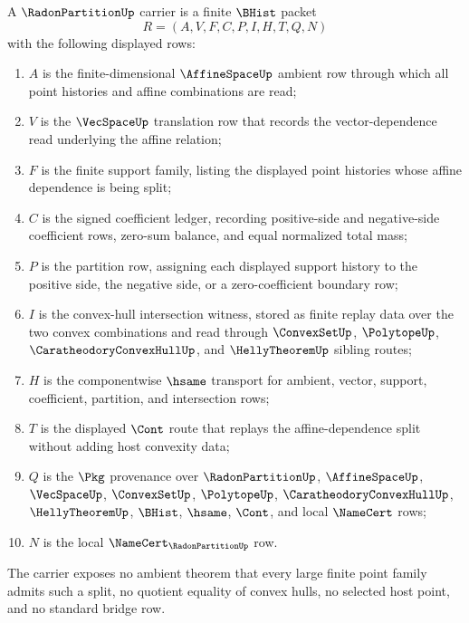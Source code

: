 \begin{definition}
\label{def:radon-partition-carrier}
A $\RadonPartitionUp$ carrier is a finite $\BHist$ packet
$$
R=(A,V,F,C,P,I,H,T,Q,N)
$$
with the following displayed rows:
\begin{enumerate}
\item $A$ is the finite-dimensional $\AffineSpaceUp$ ambient row through which all point histories and affine combinations are read;
\item $V$ is the $\VecSpaceUp$ translation row that records the vector-dependence read underlying the affine relation;
\item $F$ is the finite support family, listing the displayed point histories whose affine dependence is being split;
\item $C$ is the signed coefficient ledger, recording positive-side and negative-side coefficient rows, zero-sum balance, and equal normalized total mass;
\item $P$ is the partition row, assigning each displayed support history to the positive side, the negative side, or a zero-coefficient boundary row;
\item $I$ is the convex-hull intersection witness, stored as finite replay data over the two convex combinations and read through $\ConvexSetUp$, $\PolytopeUp$, $\CaratheodoryConvexHullUp$, and $\HellyTheoremUp$ sibling routes;
\item $H$ is the componentwise $\hsame$ transport for ambient, vector, support, coefficient, partition, and intersection rows;
\item $T$ is the displayed $\Cont$ route that replays the affine-dependence split without adding host convexity data;
\item $Q$ is the $\Pkg$ provenance over $\RadonPartitionUp$, $\AffineSpaceUp$, $\VecSpaceUp$, $\ConvexSetUp$, $\PolytopeUp$, $\CaratheodoryConvexHullUp$, $\HellyTheoremUp$, $\BHist$, $\hsame$, $\Cont$, and local $\NameCert$ rows;
\item $N$ is the local $\NameCert_{\RadonPartitionUp}$ row.
\end{enumerate}
The carrier exposes no ambient theorem that every large finite point family admits such a split, no quotient equality of convex hulls, no selected host point, and no standard bridge row.
\end{definition}

